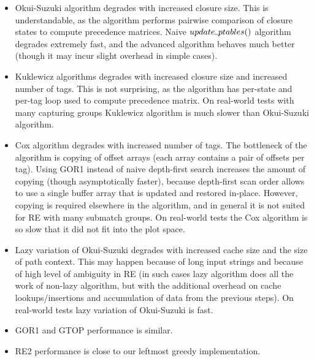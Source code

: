 \documentclass[AMA,STIX1COL]{WileyNJD-v2}
\newcommand{\Xund}{\rule{.4em}{.4pt}}
\begin{document}
\begin{itemize}[itemsep=0.5em]
    \item Okui-Suzuki algorithm degrades with increased closure size.
        This is understandable, as the algorithm performs pairwise comparison of closure states to compute precedence matrices.
        Naive $update \Xund ptables ()$ algorithm degrades extremely fast,
        and the advanced algorithm behaves much better (though it may incur slight overhead in simple cases).

    \item Kuklewicz algorithms degrades with increased closure size and increased number of tags.
        This is not surprising, as the algorithm has per-state and per-tag loop used to compute precedence matrix.
        On real-world tests with many capturing groups Kuklewicz algorithm is much slower than Okui-Suzuki algorithm.

    \item Cox algorithm degrades with increased number of tags.
        The bottleneck of the algorithm is copying of offset arrays
        (each array contains a pair of offsets per tag).
        Using GOR1 instead of naive depth-first search increases the amount of copying (though asymptotically faster),
        because depth-first scan order allows to use a single buffer array that is updated and restored in-place.
        However, copying is required elsewhere in the algorithm,
        and in general it is not suited for RE with many submatch groups.
        On real-world tests the Cox algorithm is so slow that it did not fit into the plot space.

    \item Lazy variation of Okui-Suzuki degrades with increased cache size and the size of path context.
        This may happen because of long input strings and because of high level of ambiguity in RE
        (in such cases lazy algorithm does all the work of non-lazy algorithm,
        but with the additional overhead on cache lookups/insertions and accumulation of data from the previous steps).
        On real-world tests lazy variation of Okui-Suzuki is fast.

    \item GOR1 and GTOP performance is similar.

    \item RE2 performance is close to our leftmost greedy implementation.
    \\[-0.5em]
\end{itemize}
\end{document}
